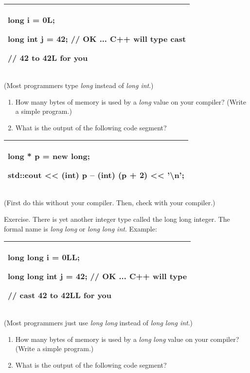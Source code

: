 \documentclass[
]{article}
\providecommand{\tightlist}{%
  \setlength{\itemsep}{0pt}\setlength{\parskip}{0pt}}
\begin{document}
\begin{longtable}[]{@{}l@{}}
\toprule
\endhead
\begin{minipage}[t]{0.97\columnwidth}\raggedright
long i = 0L;

long int j = 42; // OK ... C++ will type cast

// 42 to 42L for you\strut
\end{minipage}\tabularnewline
\bottomrule
\end{longtable}

(Most programmers type \emph{long} instead of \emph{long int}.)

\begin{enumerate}
\def\labelenumi{(\alph{enumi})}
\tightlist
\item
  How many bytes of memory is used by a \emph{long} value on your
  compiler? (Write a simple program.)
\item
  What is the output of the following code segment?
\end{enumerate}

\begin{longtable}[]{@{}l@{}}
\toprule
\endhead
\begin{minipage}[t]{0.97\columnwidth}\raggedright
long * p = new long;

std::cout \textless\textless{} (int) p -- (int) (p + 2)
\textless\textless{} '\textbackslash n';\strut
\end{minipage}\tabularnewline
\bottomrule
\end{longtable}

(First do this without your compiler. Then, check with your compiler.)

Exercise. There is yet another integer type called the long long
integer. The formal name is \emph{long} \emph{long} or \emph{long long
int}. Example:

\begin{longtable}[]{@{}l@{}}
\toprule
\endhead
\begin{minipage}[t]{0.97\columnwidth}\raggedright
long long i = 0LL;

long long int j = 42; // OK ... C++ will type

// cast 42 to 42LL for you\strut
\end{minipage}\tabularnewline
\bottomrule
\end{longtable}

(Most programmers just use \emph{long long} instead of \emph{long long
int}.)

\begin{enumerate}
\def\labelenumi{(\alph{enumi})}
\tightlist
\item
  How many bytes of memory is used by a \emph{long} \emph{long} value on
  your compiler? (Write a simple program.)
\item
  What is the output of the following code segment?
\end{enumerate}
\end{document}
